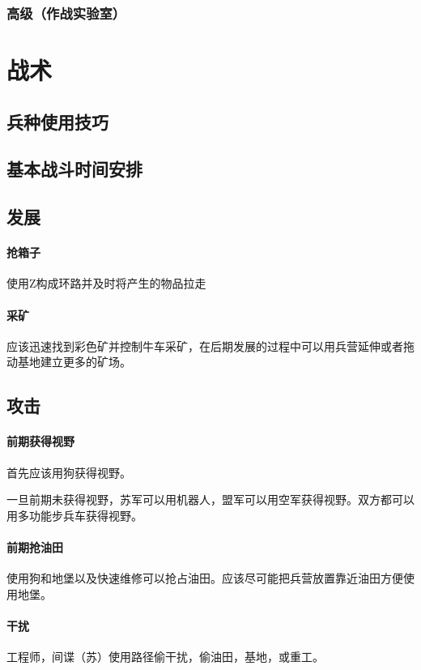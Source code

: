 \documentclass[12pt]{ctexart}
\begin{document}
			\subsubsection{高级（作战实验室）}
	\newpage
	
	\section{战术}
		\subsection{兵种使用技巧}
		
		\subsection{基本战斗时间安排}
		\subsection{发展}
			\paragraph{抢箱子}
			使用Z构成环路并及时将产生的物品拉走
			\paragraph{采矿}
			应该迅速找到彩色矿并控制牛车采矿，在后期发展的过程中可以用兵营延伸或者拖动基地建立更多的矿场。
		\subsection{攻击}
			\paragraph{前期获得视野}
			首先应该用狗获得视野。
			
			一旦前期未获得视野，苏军可以用机器人，盟军可以用空军获得视野。双方都可以用多功能步兵车获得视野。
			\paragraph{前期抢油田}
			使用狗和地堡以及快速维修可以抢占油田。应该尽可能把兵营放置靠近油田方便使用地堡。
			\paragraph{干扰}
			工程师，间谍（苏）使用路径偷干扰，偷油田，基地，或重工。
			
\end{document}
